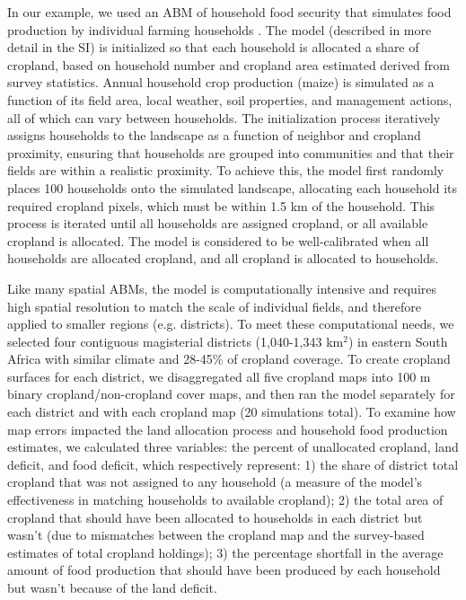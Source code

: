 \documentclass[a4paper]{article}
\begin{document}
In our example, we used an ABM of household food security that simulates food production by individual farming households \citep[the agents; ][]{chen_dependency_2013}. The model (described in more detail in the SI) is initialized so that each household is allocated a share of cropland, based on household number and cropland area estimated derived from survey statistics. Annual household crop production (maize) is simulated as a function of its field area, local weather, soil properties, and management actions, all of which can vary between households. The initialization process iteratively assigns households to the landscape as a function of neighbor and cropland proximity, ensuring that households are grouped into communities and that their fields are within a realistic proximity. To achieve this, the model first randomly places 100 households onto the simulated landscape, allocating each household its required cropland pixels, which must be within 1.5 km of the household. This process is iterated until all households are assigned cropland, or all available cropland is allocated. The model is considered to be well-calibrated when all households are allocated cropland, and all cropland is allocated to households. 

Like many spatial ABMs, the model is computationally intensive and requires high spatial resolution to match the scale of individual fields, and therefore applied to smaller regions (e.g. districts). To meet these computational needs, we selected four contiguous magisterial districts (1,040-1,343 km$^2$) in eastern South Africa with similar climate and 28-45\% of cropland coverage. To create cropland surfaces for each district, we disaggregated all five cropland maps into 100 m binary cropland/non-cropland cover maps, and then ran the model separately for each district and with each cropland map (20 simulations total). To examine how map errors impacted the land allocation process and household food production estimates, we calculated three variables: the percent of unallocated cropland, land deficit, and food deficit, which respectively represent: 1) the share of district total cropland that was not assigned to any household (a measure of the model's effectiveness in matching households to available cropland); 2) the total area of cropland that should have been allocated to households in each district but wasn't (due to mismatches between the cropland map and the survey-based estimates of total cropland holdings); 3) the percentage shortfall in the average amount of food production that should have been produced by each household but wasn't because of the land deficit. 
\end{document}

